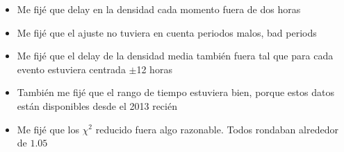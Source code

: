       \begin{itemize}
        \item Me fijé que delay en la densidad cada momento fuera de dos  horas
        \item Me fijé que el ajuste no tuviera en cuenta periodos malos, bad periods
        \item Me fijé que el delay de la densidad media también fuera tal que para cada evento estuviera centrada $\pm$12 horas
        \item También me fijé que el rango de tiempo estuviera bien, porque estos datos están disponibles desde el 2013  recién
        \item Me fijé que los $\chi^2$ reducido fuera algo razonable. Todos rondaban alrededor de $1.05$
      \end{itemize}

